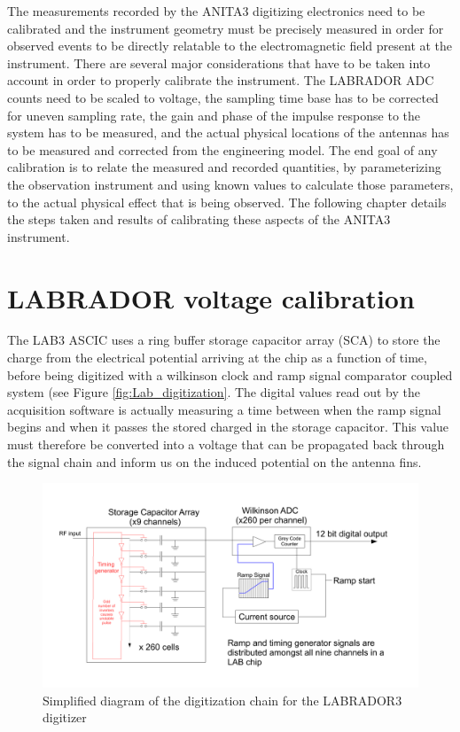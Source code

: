 	The measurements recorded by the ANITA3 digitizing electronics need to be calibrated and the instrument geometry must be precisely measured in order for observed events to be directly relatable to the electromagnetic field present at the instrument.  There are several major considerations that have to be taken into account in order to properly calibrate the instrument.  The LABRADOR ADC counts need to be scaled to voltage, the sampling time base has to be corrected for uneven sampling rate, the gain and phase of the impulse response to the system has to be measured, and the actual physical locations of the antennas has to be measured and corrected from the engineering model.  The end goal of any calibration is to relate the measured and recorded quantities, by parameterizing the observation instrument and using known values to calculate those parameters, to the actual physical effect that is being observed.  The following chapter details the steps taken and results of calibrating these aspects of the ANITA3 instrument.
	
	
\section{LABRADOR voltage calibration}
	
		The LAB3 ASCIC uses a ring buffer storage capacitor array (SCA) to store the charge from the electrical potential arriving at the chip as a function of time, before being digitized with a wilkinson clock and ramp signal comparator coupled system (see Figure \ref{fig:Lab_digitization}.  The digital values read out by the acquisition software is actually measuring a time between when the ramp signal begins and when it passes the stored charged in the storage capacitor.  This value must therefore be converted into a voltage that can be propagated back through the signal chain and inform us on the induced potential on the antenna fins.  

\begin{figure}
	\includegraphics[width=\textwidth]{figures/LAB_Digitization}
	\caption{Simplified diagram of the digitization chain for the LABRADOR3 digitizer}
	\label{fig:Lab_Digitization}
\end{figure}	
		
